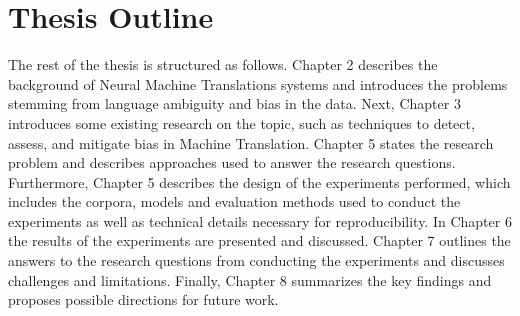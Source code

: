 \section{Thesis Outline}
\label{sec:Introduction:Outline}
The rest of the thesis is structured as follows. Chapter 2 describes the background of Neural Machine Translations systems and introduces the problems stemming from language ambiguity and bias in the data. Next, Chapter 3 introduces some existing research on the topic, such as techniques to detect, assess, and mitigate bias in Machine Translation. Chapter 5 states the research problem and describes approaches used to answer the research questions. Furthermore, Chapter 5 describes the design of the experiments performed, which includes the corpora, models and evaluation methods used to conduct the experiments as well as technical details necessary for reproducibility. In Chapter 6 the results of the experiments are presented and discussed. Chapter 7 outlines the answers to the research questions from conducting the experiments and discusses challenges and limitations. Finally, Chapter 8 summarizes the key findings and proposes possible directions for future work.














